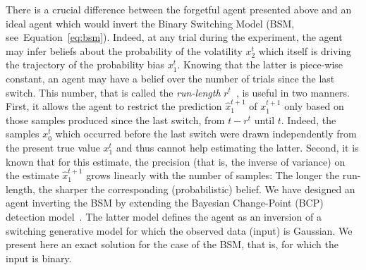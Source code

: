 \documentclass[10pt,letterpaper]{article}
\newcommand{\citep}[1]{\cite{#1}}
\newcommand{\seeEq}[1]{Equation~\ref{eq:#1}}
\newcommand{\AM}[1]{\textbf{\textcolor{blue}{[AM: #1]}}}
\begin{document}
There is a crucial difference between the forgetful agent presented above
and an ideal agent which would invert the Binary Switching Model (BSM, see~\seeEq{bsm}).
Indeed, at any trial during the experiment,
the agent may infer beliefs about the probability of the volatility $x_2^t$
which itself is driving the trajectory of the probability bias $x_1^t$.
Knowing that the latter is piece-wise constant,
an agent may have a belief over the number of trials since the last switch.
This number, that is called the \emph{run-length} $r^t$~\citep{AdamsMackay2007}, is useful in two manners.
First, it allows the agent to restrict the prediction $\hat{x}_1^{t+1}$ of $x_1^{t+1}$
only based on those samples produced since the last switch, from $t-r^t$ until $t$.
Indeed, the samples $x_0^t$ which occurred before the last switch
were drawn independently from the present true value $x_1^t$
and thus cannot help estimating the latter.
Second, it is known that for this estimate, the precision
(that is, the inverse of variance) on the estimate $\hat{x}_1^{t+1}$
grows linearly with the number of samples:
The longer the run-length, the sharper the corresponding (probabilistic) belief.
We have designed an agent inverting the BSM by extending
the Bayesian Change-Point (BCP) detection model~\citep{AdamsMackay2007}.
The latter model defines the agent as an inversion of a switching generative model
for which the observed data (input) is Gaussian.
We present here an exact solution for the case of the BSM,
that is, for which the input is binary. %
\end{document}
